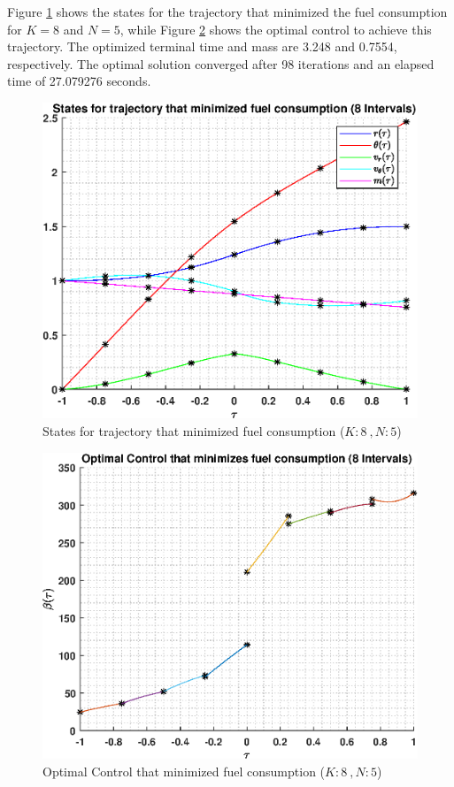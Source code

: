 \documentclass[]{article}
\begin{document}
\vspace{2mm}\newline 
Figure \ref{fig:directStatesK8Poly5} shows the states for the trajectory that minimized the fuel consumption for \(K = 8\) and  \(N = 5\), while Figure \ref{fig:directControlK8Poly5} shows the optimal control to achieve this trajectory. The optimized terminal time and mass are 3.248 and 0.7554, respectively. The optimal solution converged after 98 iterations and an elapsed time of 27.079276 seconds.
\begin{figure}
	\centering
	\includegraphics[scale=0.75]{directStatesK8Poly5.eps}
	\caption{States for trajectory that minimized fuel consumption (\(K:8\ , N:5\))}
	\label{fig:directStatesK8Poly5}
\end{figure}
\begin{figure}
	\centering
	\includegraphics[scale=0.75]{directControlK8Poly5.eps}
	\caption{Optimal Control that minimized fuel consumption (\(K:8\ , N:5\))}
	\label{fig:directControlK8Poly5}
\end{figure}
\end{document}
